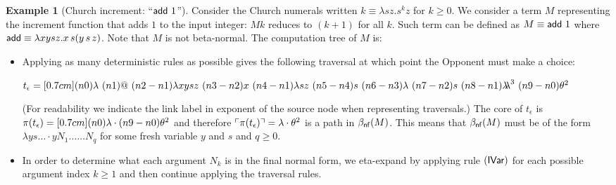 \documentclass{article}
\theoremstyle{definition}
\newtheorem{example}{Example}[section]
\newcommand{\ghostlmd}{{\lambda\!\!\lambda}}
\newcommand{\ghostvar}{\theta}
\def\coresymbol{\pi} %
\newcommand{\core}[1]{\coresymbol(#1)} %
\begin{document}
\begin{example}[Church increment: ``${\sf add}\ 1$'']
Consider the Church numerals written $k \equiv \lambda s z . s^k z$ for $k\geq0$. We consider a term $M$ representing the increment function that adds $1$ to the input integer: $M k$ reduces to $(k+1)$ for all $k$. Such term can be defined as $M \equiv{\sf add}\ 1$ where
${\sf add} \equiv \lambda x y s z. x\, s (y\, s\, z)$.
Note that $M$ is not beta-normal.
The computation tree of $M$ is:

\begin{itemize}
\item Applying as many deterministic rules as possible gives the following traversal at which point the Opponent must make a choice:

$t_\epsilon = \Pstr[0.7cm]{(n0){\lambda }\ (n1){@}\ (n2-n1){\lambda x y s z}\ (n3-n2){x}\ (n4-n1){\lambda s z}\ (n5-n4){s}\ (n6-n3){\lambda }\ (n7-n2){s}\ (n8-n1){\ghostlmd^3}\ (n9-n0){\ghostvar^2} }$

(For readability we indicate the link label in exponent of the source node when representing traversals.)
The core of $t_\epsilon$ is
$\core{t_\epsilon} = \Pstr[0.7cm]{(n0){\lambda } \cdot (n9-n0){{\ghostvar^2}} }$
and therefore $\pview{\core{t_\epsilon}} =  \lambda \cdot \ghostvar^2$ is a path in  $\beta_{\sf nf}(M)$.
This means that $\beta_{\sf nf}(M)$ must be of the form $\lambda y s \ldots \cdot y N_1 \ldots \ldots N_q$ for some fresh variable $y$ and $s$ and $q\geq0$.

\item In order to determine what each argument $N_k$ is in the final normal form, we eta-expand by applying rule $\mathbf{({\sf IVar})}$ for each possible argument index $k\geq 1$ and then continue applying the traversal rules.


\end{itemize}
\end{example}
\end{document}
